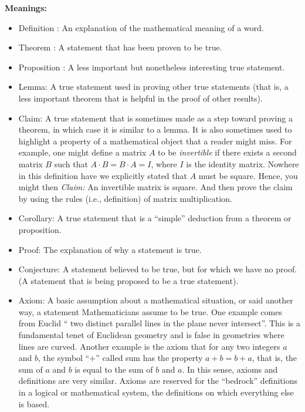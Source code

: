 \textbf{Meanings:}
\begin{itemize}
\item Definition : An explanation of the mathematical meaning of a word.
\item Theorem : A statement that has been proven to be true.
\item Proposition : A less important but nonetheless interesting true statement.
\item Lemma: A true statement used in proving other true statements (that is, a less important theorem that is helpful in the proof of other results).
\item Claim: A true statement that is sometimes made as a step toward proving a theorem, in which case it is similar to a lemma. It is also sometimes used to highlight a property of a mathematical object that a reader might miss. 
For example, one might define a matrix $A$ to be \emph{invertible} if there exists a second matrix $B$ such that $A\cdot B = B \cdot A = I$, where $I$ is the identity matrix. Nowhere in this definition have we explicitly stated that $A$ must be square. Hence, you might then 
\emph{Claim:} An invertible matrix is square. And then prove the claim by using the rules (i.e., definition) of matrix multiplication.
\item Corollary: A true statement that is a ``simple'' deduction from a theorem or proposition.
\item Proof: The explanation of why a statement is true.
\item Conjecture: A statement believed to be true, but for which we have no proof. (A statement that is being proposed to be a true statement).
\item Axiom: A basic assumption about a mathematical situation, or said another way, a statement Mathematicians assume to be true. One example comes from Euclid `` two distinct parallel lines in the plane never intersect''. This is a fundamental tenet of Euclidean geometry and is false in geometries where lines are curved. Another example is the axiom that for any two integers $a$ and $b$, the symbol ``$+$'' called sum has the property $a+b=b+a$, that is, the sum of $a$ and $b$ is equal to the sum of $b$ and $a$. In this sense, axioms and definitions are very similar. Axioms are reserved for the ``bedrock'' definitions in a logical or mathematical system, the definitions on which everything else is based.  
\end{itemize}





